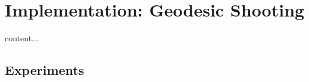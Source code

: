 \section{Implementation: Geodesic Shooting}

\begin{definition}
	content...
\end{definition}

\subsection{Experiments}